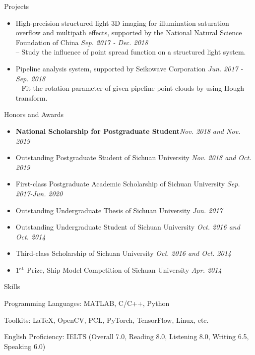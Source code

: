 \documentclass{resume} %
\begin{document}
\begin{rSection}{Projects}
\begin{itemize}[leftmargin=*]
		\item  High-precision structured light 3D imaging for illumination saturation overflow and multipath effects, supported by the National Natural Science Foundation of China 
		\hfill {\em Sep. 2017 - Dec. 2018}\vspace{1.5mm}\\		
		-- Study the influence of point spread function on a structured light system.
		
		\item  Pipeline analysis system, supported by Seikowave Corporation 
		\hfill {\em Jun. 2017 - Sep. 2018}\vspace{1.5mm}\\		
		-- Fit the rotation parameter of given pipeline point clouds by using Hough transform.
							
	\end{itemize}
\end{rSection}

\begin{rSection}{Honors and Awards}
	\begin{itemize}[leftmargin=*]
		\item \textbf{National Scholarship for Postgraduate Student}\hfill {\em Nov. 2018 and Nov. 2019}
		\item Outstanding Postgraduate Student of Sichuan University \hfill {\em Nov. 2018 and Oct. 2019} 
		\item First-class Postgraduate Academic Scholarship of Sichuan University \hfill {\em Sep. 2017-Jun. 2020}
		\item Outstanding Undergraduate Thesis of Sichuan University \hfill {\em Jun. 2017}
		\item Outstanding Undergraduate Student of Sichuan University \hfill {\em Oct. 2016 and Oct. 2014} 
		\item Third-class Scholarship of Sichuan University \hfill {\em Oct. 2016 and Oct. 2014}
		\item {1$^{\rm st}$} Prize, Ship Model Competition of Sichuan University \hfill {\em Apr. 2014}
	\end{itemize}
	
\end{rSection}

\begin{rSection}{Skills}
	\item Programming Languages: MATLAB, C/C++, Python
	\item Toolkits: \LaTeX, OpenCV, PCL, PyTorch, TensorFlow, Linux, etc.
	\item English Proficiency: IELTS (Overall 7.0, Reading 8.0, Listening 8.0, Writing 6.5, Speaking 6.0)
\end{rSection}
\end{document}
